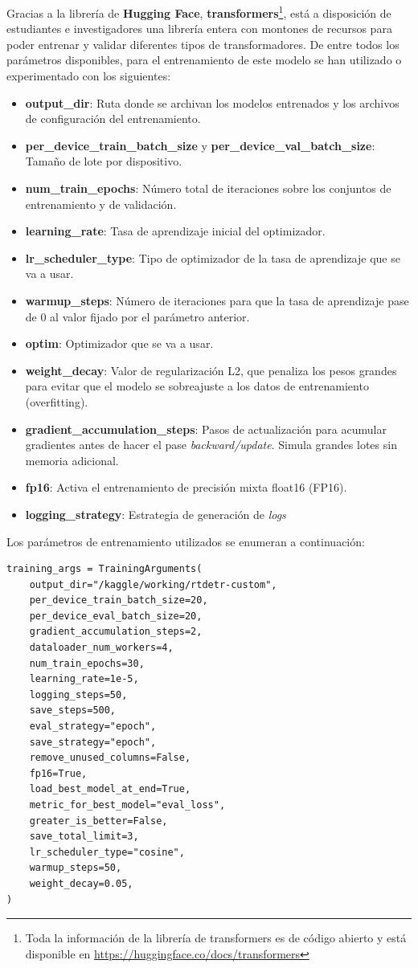 \documentclass[12pt,a4paper,onecolumn,oneside]{report}
\begin{document}
Gracias a la librería de \textbf{Hugging Face}, \textbf{transformers}\footnote{Toda la información de la librería de transformers es de código abierto y está disponible en \url{https://huggingface.co/docs/transformers}}, está a disposición de estudiantes e investigadores una librería entera con montones de recursos para poder entrenar y validar diferentes tipos de transformadores. De entre todos los parámetros disponibles, para el entrenamiento de este modelo se han utilizado o experimentado con los siguientes:
\begin{itemize}
    \item \textbf{output\_dir}: Ruta donde se archivan los modelos entrenados y los archivos de configuración del entrenamiento.
    \item \textbf{per\_device\_train\_batch\_size} y \textbf{per\_device\_val\_batch\_size}: Tamaño de lote por dispositivo. 
    \item \textbf{num\_train\_epochs}: Número total de iteraciones sobre los conjuntos de entrenamiento y de validación.
    \item \textbf{learning\_rate}: Tasa de aprendizaje inicial del optimizador.
    \item \textbf{lr\_scheduler\_type}: Tipo de optimizador de la tasa de aprendizaje que se va a usar.
    \item \textbf{warmup\_steps}: Número de iteraciones para que la tasa de aprendizaje pase de 0 al valor fijado por el parámetro anterior.
    \item \textbf{optim}: Optimizador que se va a usar.
    \item \textbf{weight\_decay}: Valor de regularización L2, que penaliza los pesos grandes para evitar que el modelo se sobreajuste a los datos de entrenamiento (overfitting).
    \item \textbf{gradient\_accumulation\_steps}: Pasos de actualización para acumular gradientes antes de hacer el pase \textit{backward/update}. Simula grandes lotes sin memoria adicional.
    \item \textbf{fp16}: Activa el entrenamiento de precisión mixta float16 (FP16).
    \item \textbf{logging\_strategy}: Estrategia de generación de \textit{logs} 
\end{itemize}

Los parámetros de entrenamiento utilizados se enumeran a continuación:

\begin{lstlisting}
training_args = TrainingArguments(
    output_dir="/kaggle/working/rtdetr-custom",
    per_device_train_batch_size=20,
    per_device_eval_batch_size=20,
    gradient_accumulation_steps=2,
    dataloader_num_workers=4,
    num_train_epochs=30,
    learning_rate=1e-5,
    logging_steps=50,
    save_steps=500,
    eval_strategy="epoch",
    save_strategy="epoch",
    remove_unused_columns=False,
    fp16=True,
    load_best_model_at_end=True,
    metric_for_best_model="eval_loss",
    greater_is_better=False,
    save_total_limit=3,
    lr_scheduler_type="cosine",
    warmup_steps=50,
    weight_decay=0.05,
)
\end{lstlisting}
\end{document}
